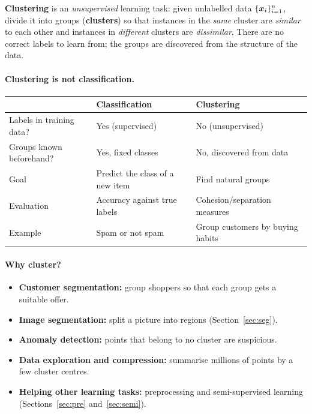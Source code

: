 \begin{definition}[: Clustering]
\textbf{Clustering} is an \emph{unsupervised} learning task: given unlabelled data $\{\boldsymbol{x}_i\}_{i=1}^n$, divide it into groups (\textbf{clusters}) so that instances in the \emph{same} cluster are \emph{similar} to each other and instances in \emph{different} clusters are \emph{dissimilar}. There are no correct labels to learn from; the groups are discovered from the structure of the data.
\end{definition}

\paragraph{Clustering is not classification.}
\begin{center}
\begin{tabular}{@{}p{3.3cm}p{5.5cm}p{5.5cm}@{}}
\toprule
 & \textbf{Classification} & \textbf{Clustering}\\
\midrule
Labels in training data? & Yes (supervised) & No (unsupervised)\\
Groups known beforehand? & Yes, fixed classes & No, discovered from data\\
Goal & Predict the class of a new item & Find natural groups\\
Evaluation & Accuracy against true labels & Cohesion/separation measures\\
Example & Spam or not spam & Group customers by buying habits\\
\bottomrule
\end{tabular}
\end{center}

\paragraph{Why cluster?}
\begin{itemize}
  \item \textbf{Customer segmentation:} group shoppers so that each group gets a suitable offer.
  \item \textbf{Image segmentation:} split a picture into regions (Section~\ref{sec:seg}).
  \item \textbf{Anomaly detection:} points that belong to no cluster are suspicious.
  \item \textbf{Data exploration and compression:} summarise millions of points by a few cluster centres.
  \item \textbf{Helping other learning tasks:} preprocessing and semi-supervised learning (Sections~\ref{sec:pre} and~\ref{sec:semi}).
\end{itemize}

